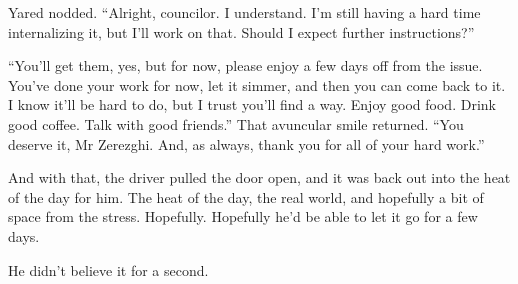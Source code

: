 Yared nodded. ``Alright, councilor. I understand. I'm still having a hard time internalizing it, but I'll work on that. Should I expect further instructions?''

``You'll get them, yes, but for now, please enjoy a few days off from the issue. You've done your work for now, let it simmer, and then you can come back to it. I know it'll be hard to do, but I trust you'll find a way. Enjoy good food. Drink good coffee. Talk with good friends.'' That avuncular smile returned. ``You deserve it, Mr Zerezghi. And, as always, thank you for all of your hard work.''

And with that, the driver pulled the door open, and it was back out into the heat of the day for him. The heat of the day, the real world, and hopefully a bit of space from the stress. Hopefully. Hopefully he'd be able to let it go for a few days.

He didn't believe it for a second.

